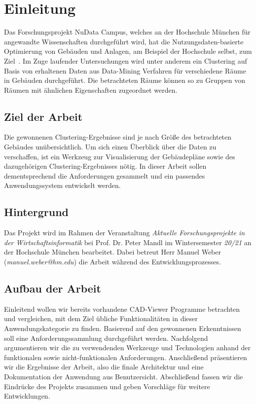 \section{Einleitung}
\label{sec:introduction}

Das Forschungsprojekt \glqq{}NuData Campus\grqq{}, welches an der Hochschule München für angewandte Wissenschaften durchgeführt wird, hat die Nutzungsdaten-basierte Optimierung von Gebäuden und Anlagen, am Beispiel der Hochschule selbst, zum Ziel~\cite{NuDataCampus}.
Im Zuge laufender Untersuchungen wird unter anderem ein Clustering auf Basis von erhaltenen Daten aus Data-Mining Verfahren für verschiedene Räume in Gebäuden durchgeführt.
Die betrachteten Räume können so zu Gruppen von Räumen mit ähnlichen Eigenschaften zugeordnet werden.

\subsection{Ziel der Arbeit}
\label{subsec:purpose}

Die gewonnenen Clustering-Ergebnisse sind je nach Größe des betrachteten Gebäudes unübersichtlich.
Um sich einen Überblick über die Daten zu verschaffen, ist ein Werkzeug zur Visualisierung der Gebäudepläne sowie des dazugehörigen Clustering-Ergebnisses nötig.
In dieser Arbeit sollen dementsprechend die Anforderungen gesammelt und ein passendes Anwendungssystem entwickelt werden.

\subsection{Hintergrund}
\label{subsec:background}

Das Projekt wird im Rahmen der Veranstaltung \textit{\glqq{}Aktuelle Forschungsprojekte in der Wirtschaftsinformatik\grqq{}} bei Prof. Dr. Peter Mandl im Wintersemester \textit{20/21} an der Hochschule München bearbeitet.
Dabei betreut Herr Manuel Weber (\textit{manuel.weber@hm.edu}) die Arbeit während des Entwicklungsprozesses.

\subsection{Aufbau der Arbeit}
\label{subsec:structure}

Einleitend wollen wir bereits vorhandene CAD-Viewer Programme betrachten und vergleichen, mit dem Ziel übliche Funktionalitäten in dieser Anwendungskategorie zu finden.
Basierend auf den gewonnenen Erkenntnissen soll eine Anforderungssammlung durchgeführt werden.
Nachfolgend argumentieren wir die zu verwendenden Werkzeuge und Technologien anhand der funktionalen sowie nicht-funktionalen Anforderungen.
Anschließend präsentieren wir die Ergebnisse der Arbeit, also die finale Architektur und eine Dokumentation der Anwendung aus Benutzersicht.
Abschließend fassen wir die Eindrücke des Projekts zusammen und geben Vorschläge für weitere Entwicklungen.

